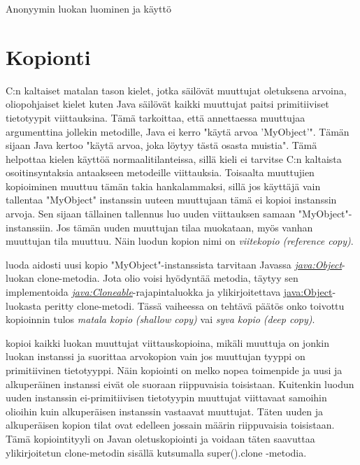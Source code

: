 \documentclass{tufte-book}
\newcommand{\eng}[1]{\textit{(#1)}}
\newcommand{\new}[1]{\textit{\gls{#1}}}
\newcommand{\neweng}[2]{\new{#1} \eng{#2}}
\newcommand{\java}[1]{\underline{\gls{java:#1}}}
\newcommand{\newjava}[1]{\textit{\java{#1}}}
\newcommand{\code}[3]{
\begin{listing}
    \inputminted{java}{OhjelmointiopasEsimerkit/src/#1/#2.java}
    \caption{#3}
    \label{Java-#1-#2}
\end{listing}
}
\begin{document}
\code{week11/anonymousclassexample}{AnonymousClassesExample}{Anonyymin luokan luominen ja käyttö}


\section{Kopionti}
\label{copying}

 C:n kaltaiset matalan tason kielet, jotka säilövät muuttujat oletuksena
arvoina, oliopohjaiset kielet kuten Java säilövät kaikki muuttujat paitsi primitiiviset
tietotyypit viittauksina. Tämä tarkoittaa, että annettaessa muuttujaa argumenttina jollekin
metodille, Java ei kerro "käytä arvoa 'MyObject'". Tämän sijaan Java kertoo "käytä arvoa, joka
löytyy tästä osasta muistia". Tämä helpottaa kielen käyttöä normaalitilanteissa, sillä kieli ei
tarvitse C:n kaltaista osoitinsyntaksia antaakseen metodeille viittauksia. Toisaalta muuttujien
kopioiminen muuttuu tämän takia hankalammaksi, sillä jos käyttäjä vain tallentaa "MyObject"
instanssin uuteen muuttujaan tämä ei kopioi instanssin arvoja. Sen sijaan tällainen tallennus luo
uuden viittauksen samaan "MyObject"-instanssiin. Jos tämän uuden muuttujan tilaa muokataan, myös
vanhan muuttujan tila muuttuu. Näin luodun kopion nimi on \neweng{viitekopio}{reference copy}.


 luoda aidosti uusi kopio "MyObject"-instanssista tarvitaan Javassa
\newjava{Object}-luokan clone-metodia. Jota olio voisi hyödyntää metodia, täytyy sen implementoida
\newjava{Cloneable}-rajapintaluokka ja ylikirjoitettava \java{Object}-luokasta peritty
clone-metodi. Tässä vaiheessa on tehtävä päätös onko toivottu kopioinnin tulos \neweng{matala
kopio}{shallow copy} vai \neweng{syva kopio}{deep copy}. 

 kopioi kaikki luokan muuttujat viittauskopioina, mikäli muuttuja
on jonkin luokan instanssi ja suorittaa arvokopion vain jos muuttujan tyyppi on primitiivinen
tietotyyppi. Näin kopiointi on melko nopea toimenpide ja uusi ja alkuperäinen instanssi eivät ole
suoraan riippuvaisia toisistaan. Kuitenkin luodun uuden instanssin ei-primitiivisen tietotyypin
muuttujat viittavaat samoihin olioihin kuin alkuperäisen instanssin vastaavat muuttujat. Täten
uuden ja alkuperäisen kopion tilat ovat edelleen jossain määrin riippuvaisia toisistaan. Tämä
kopiointityyli on Javan oletuskopiointi ja voidaan täten saavuttaa ylikirjoitetun clone-metodin
sisällä kutsumalla super().clone -metodia.
\end{document}
